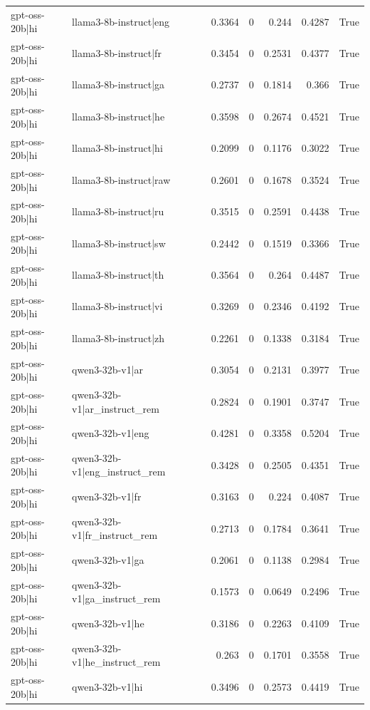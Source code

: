 \begin{table}
\begin{tabular}{l l r r r r l}
gpt-oss-20b|hi & llama3-8b-instruct|eng & 0.3364 & 0 & 0.244 & 0.4287 & True \\
gpt-oss-20b|hi & llama3-8b-instruct|fr & 0.3454 & 0 & 0.2531 & 0.4377 & True \\
gpt-oss-20b|hi & llama3-8b-instruct|ga & 0.2737 & 0 & 0.1814 & 0.366 & True \\
gpt-oss-20b|hi & llama3-8b-instruct|he & 0.3598 & 0 & 0.2674 & 0.4521 & True \\
gpt-oss-20b|hi & llama3-8b-instruct|hi & 0.2099 & 0 & 0.1176 & 0.3022 & True \\
gpt-oss-20b|hi & llama3-8b-instruct|raw & 0.2601 & 0 & 0.1678 & 0.3524 & True \\
gpt-oss-20b|hi & llama3-8b-instruct|ru & 0.3515 & 0 & 0.2591 & 0.4438 & True \\
gpt-oss-20b|hi & llama3-8b-instruct|sw & 0.2442 & 0 & 0.1519 & 0.3366 & True \\
gpt-oss-20b|hi & llama3-8b-instruct|th & 0.3564 & 0 & 0.264 & 0.4487 & True \\
gpt-oss-20b|hi & llama3-8b-instruct|vi & 0.3269 & 0 & 0.2346 & 0.4192 & True \\
gpt-oss-20b|hi & llama3-8b-instruct|zh & 0.2261 & 0 & 0.1338 & 0.3184 & True \\
gpt-oss-20b|hi & qwen3-32b-v1|ar & 0.3054 & 0 & 0.2131 & 0.3977 & True \\
gpt-oss-20b|hi & qwen3-32b-v1|ar_instruct_rem & 0.2824 & 0 & 0.1901 & 0.3747 & True \\
gpt-oss-20b|hi & qwen3-32b-v1|eng & 0.4281 & 0 & 0.3358 & 0.5204 & True \\
gpt-oss-20b|hi & qwen3-32b-v1|eng_instruct_rem & 0.3428 & 0 & 0.2505 & 0.4351 & True \\
gpt-oss-20b|hi & qwen3-32b-v1|fr & 0.3163 & 0 & 0.224 & 0.4087 & True \\
gpt-oss-20b|hi & qwen3-32b-v1|fr_instruct_rem & 0.2713 & 0 & 0.1784 & 0.3641 & True \\
gpt-oss-20b|hi & qwen3-32b-v1|ga & 0.2061 & 0 & 0.1138 & 0.2984 & True \\
gpt-oss-20b|hi & qwen3-32b-v1|ga_instruct_rem & 0.1573 & 0 & 0.0649 & 0.2496 & True \\
gpt-oss-20b|hi & qwen3-32b-v1|he & 0.3186 & 0 & 0.2263 & 0.4109 & True \\
gpt-oss-20b|hi & qwen3-32b-v1|he_instruct_rem & 0.263 & 0 & 0.1701 & 0.3558 & True \\
gpt-oss-20b|hi & qwen3-32b-v1|hi & 0.3496 & 0 & 0.2573 & 0.4419 & True \\

\end{tabular}
\end{table}
